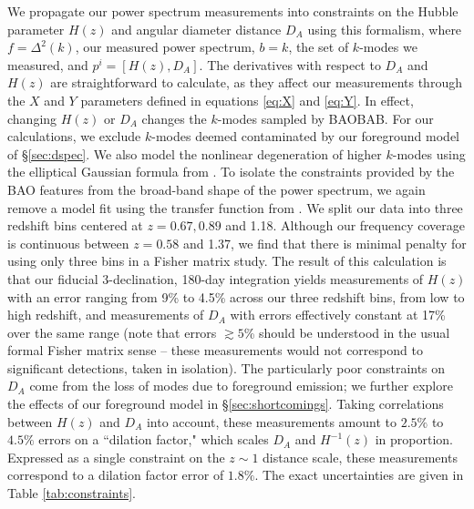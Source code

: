 \documentclass[10pt,iop]{emulateapj}
\begin{document}
We propagate our power spectrum measurements into constraints on the Hubble parameter $H(z)$
and angular diameter distance $D_A$
using this formalism, where $f = \Delta^2(k)$, our measured power spectrum, $b = k$, the set
of $k$-modes we measured, and $p^i = [H(z),D_A]$.
The derivatives with respect to $D_A$ and $H(z)$ are straightforward to calculate, as they affect
our measurements through the $X$ and $Y$ parameters defined in equations \ref{eq:X} and \ref{eq:Y}.
In effect, changing $H(z)$ or $D_A$ changes the $k$-modes sampled by BAOBAB.
For our calculations, we exclude $k$-modes deemed contaminated by our foreground
model of \S\ref{sec:dspec}.  We also model the nonlinear degeneration of higher $k$-modes
using the elliptical Gaussian formula from \citet{seo_and_eisenstein_2007}.
To isolate the constraints provided by the BAO features from the broad-band shape of the
power spectrum, we again remove a model fit using the transfer function from
\citet{eisenstein_and_hu_1998}.  We split our data into three redshift bins centered at 
$z = 0.67,0.89$ and 1.18.  Although our frequency coverage is continuous between 
$z = 0.58$ and 1.37, we find that there is minimal penalty for using only three bins in a Fisher matrix
study.  The result of this calculation is that our fiducial 3-declination, 180-day 
integration yields measurements of 
$H(z)$ with an error ranging from 9\% to 4.5\% across our three redshift bins, from low to high redshift, and measurements of $D_A$ with errors effectively constant at 17\% over the same range
(note that errors $\gtrsim 5$\% should
be understood in the usual formal Fisher matrix sense -- these measurements
would not correspond to significant detections, taken in isolation).  
The particularly poor constraints on $D_A$ come from the loss of modes due to foreground emission;
we further explore the effects of our foreground model in \S\ref{sec:shortcomings}.
Taking
correlations between $H(z)$ and $D_A$ into account, these measurements amount to $2.5\%$ to $4.5\%$
errors on a ``dilation factor," which scales $D_A$ and $H^{-1}(z)$ in proportion.  Expressed
as a single constraint on the $z \sim 1$ distance scale, these measurements correspond to a
dilation factor error of $1.8\%$.
The exact uncertainties are given in Table \ref{tab:constraints}.
\end{document}
